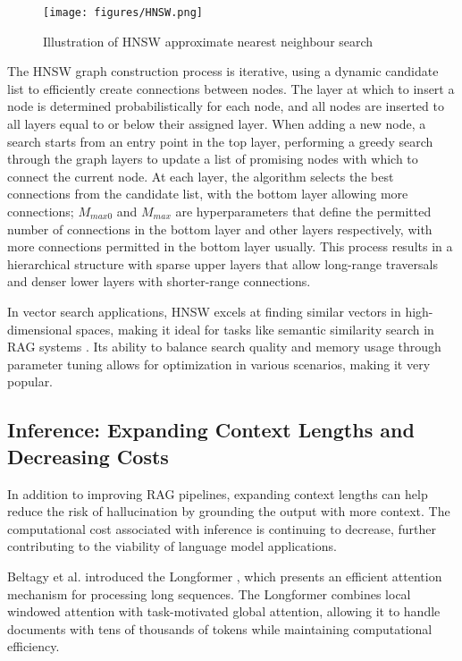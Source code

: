\documentclass[a4paper, oneside]{discothesis}
\begin{document}
\begin{figure}[h]
    \centering
    \texttt{[image: figures/HNSW.png]}
    \caption{Illustration of HNSW approximate nearest neighbour search}
    \label{fig:hnsw_structure}
    \end{figure}

The HNSW graph construction process is iterative, using a dynamic candidate list to efficiently create connections between nodes. The layer at which to insert a node is determined probabilistically for each node, and all nodes are inserted to all layers equal to or below their assigned layer. When adding a new node, a search starts from an entry point in the top layer, performing a greedy search through the graph layers to update a list of promising nodes with which to connect the current node. At each layer, the algorithm selects the best connections from the candidate list, with the bottom layer allowing more connections; $M_{max0}$ and $M_{max}$ are hyperparameters that define the permitted number of connections in the bottom layer and other layers respectively, with more connections permitted in the bottom layer usually. This process results in a hierarchical structure with sparse upper layers that allow long-range traversals and denser lower layers with shorter-range connections.

In vector search applications, HNSW excels at finding similar vectors in high-dimensional spaces, making it ideal for tasks like semantic similarity search in RAG systems \cite{johnson2019billion}. Its ability to balance search quality and memory usage through parameter tuning allows for optimization in various scenarios, making it very popular. 

\subsection{Inference: Expanding Context Lengths and Decreasing Costs}
In addition to improving RAG pipelines, expanding context lengths can help reduce the risk of hallucination by grounding the output with more context. The computational cost associated with inference is continuing to decrease, further contributing to the viability of language model applications. 

Beltagy et al. introduced the Longformer \cite{beltagy2020longformer}, which presents an efficient attention mechanism for processing long sequences. The Longformer combines local windowed attention with task-motivated global attention, allowing it to handle documents with tens of thousands of tokens while maintaining computational efficiency.
\end{document}
